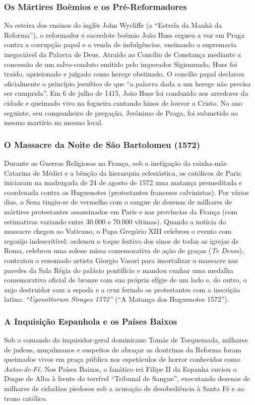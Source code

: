 \documentclass[11pt,a4paper,openany]{book}
\begin{document}
\subsubsection*{Os Mártires Boêmios e os Pré-Reformadores}
Na esteira dos ensinos do inglês John Wycliffe (a ``Estrela da Manhã da Reforma''), o reformador e sacerdote boêmio João Huss ergueu a voz em Praga contra a corrupção papal e a venda de indulgências, ensinando a supremacia inegociável da Palavra de Deus. Atraído ao Concílio de Constança mediante a concessão de um salvo-conduto emitido pelo imperador Sigismundo, Huss foi traído, aprisionado e julgado como herege obstinado. O concílio papal declarou oficialmente o princípio jesuítico de que ``a palavra dada a um herege não precisa ser cumprida''. Em 6 de julho de 1415, João Huss foi conduzido aos arredores da cidade e queimado vivo na fogueira cantando hinos de louvor a Cristo. No ano seguinte, seu companheiro de pregação, Jerônimo de Praga, foi submetido ao mesmo martírio no mesmo local.


\subsubsection*{O Massacre da Noite de São Bartolomeu (1572)}
Durante as Guerras Religiosas na França, sob a instigação da rainha-mãe Catarina de Médici e a bênção da hierarquia eclesiástica, os católicos de Paris iniciaram na madrugada de 24 de agosto de 1572 uma matança premeditada e coordenada contra os Huguenotes (protestantes franceses calvinistas). Por vários dias, o Sena tingiu-se de vermelho com o sangue de dezenas de milhares de mártires protestantes assassinados em Paris e nas províncias da França (com estimativas variando entre 30.000 e 70.000 vítimas). Quando a notícia do massacre chegou ao Vaticano, o Papa Gregório XIII celebrou o evento com regozijo indescritível: ordenou o toque festivo dos sinos de todas as igrejas de Roma, celebrou uma solene missa comemorativa de ação de graças (\textit{Te Deum}), contratou o renomado artista Giorgio Vasari para imortalizar o massacre nas paredes da Sala Régia do palácio pontifício e mandou cunhar uma medalha comemorativa oficial de bronze com sua própria efígie de um lado e, do outro, o anjo destruidor com a espada e a cruz ferindo os protestantes com a inscrição latina: \textit{``Ugonottorum Strages 1572''} (``A Matança dos Huguenotes 1572'').


\subsubsection*{A Inquisição Espanhola e os Países Baixos}
Sob o comando do inquisidor-geral dominicano Tomás de Torquemada, milhares de judeus, muçulmanos e suspeitos de abraçar as doutrinas da Reforma foram queimados vivos em praça pública nos espetáculos de horror conhecidos como \textit{Autos-de-Fé}. Nos Países Baixos, o fanático rei Filipe II da Espanha enviou o Duque de Alba à frente do terrível ``Tribunal de Sangue'', executando dezenas de milhares de cidadãos piedosos sob a acusação de desobediência à Santa Fé e ao trono católico.
\end{document}
